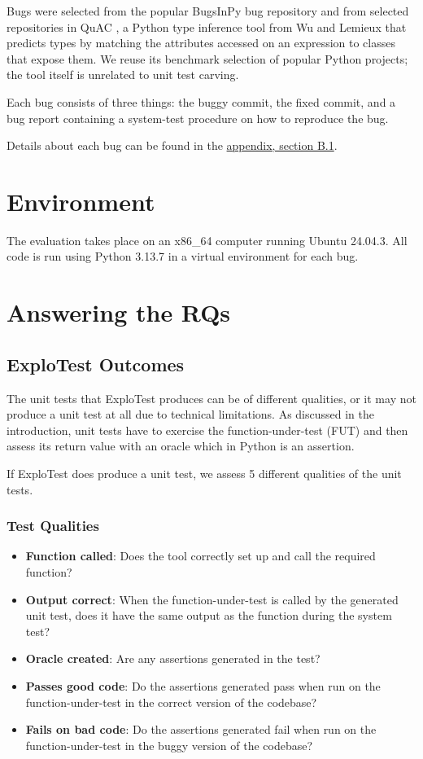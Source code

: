 Bugs were selected from the popular BugsInPy bug repository \cite{widyasari2020bugsinpy} and from selected
repositories in QuAC \cite{wu2024quac}, a Python type inference tool from Wu and Lemieux that predicts types by
matching the attributes accessed on an expression to classes that expose them. We reuse its benchmark selection of
popular Python projects; the tool itself is unrelated to unit test carving.

Each bug consists of three things: the buggy commit, the fixed commit, and a bug report containing a
system-test procedure on how to reproduce the bug.

Details about each bug can be found in the \hyperref[sec:AppendixLinks]{appendix, section B.1}.

\section{Environment}

The evaluation takes place on an x86\_64 computer running Ubuntu 24.04.3. All code is run using Python 3.13.7
in a virtual environment for each bug.

\section{Answering the RQs}

\subsection{ExploTest Outcomes}

The unit tests that ExploTest produces can be of different qualities, or it may not produce a unit test at
all due to technical limitations. As discussed in the introduction, unit tests have to exercise the
function-under-test (FUT) and then assess its return value with an oracle which in Python is an assertion.

If ExploTest does produce a unit test, we assess 5 different qualities of the unit tests.
\subsubsection{Test Qualities}
\begin{itemize}
      \item \textbf{Function called}: Does the tool correctly set up and call the required function?
      \item \textbf{Output correct}: When the function-under-test is called by the generated unit test,
            does it have the same output as the function during the system test?
      \item \textbf{Oracle created}: Are any assertions generated in the test?
      \item \textbf{Passes good code}: Do the assertions generated pass when run on the function-under-test in
            the correct version of the codebase?
      \item \textbf{Fails on bad code}: Do the assertions generated fail when run on the function-under-test in
            the buggy version of the codebase?
\end{itemize}

